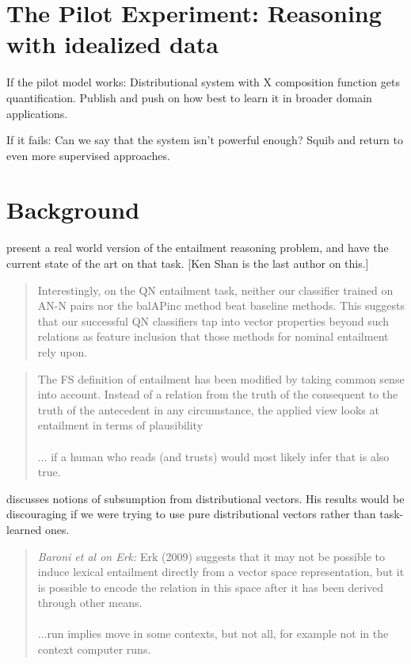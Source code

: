 \documentclass[12pt,leqno,tbtags,twoside]{article}
\theoremstyle{dotless}
\begin{document}
\section{The Pilot Experiment: Reasoning with idealized data}

If the pilot model works: Distributional system with X composition function gets quantification. Publish and push on how best to learn it in broader domain applications.

If it fails: Can we say that the system isn't powerful enough? Squib and return to even more supervised approaches.



\section{Background}

\citet{baroni2012entailment} present a real world version of the entailment reasoning problem, and have the current state of the art on that task. [Ken Shan is the last author on this.]

\begin{quote}
Interestingly, on the QN entailment task, neither our classifier trained on AN-N pairs nor the balAPinc method beat baseline methods. This suggests that our successful QN classifiers tap into vector properties beyond such relations as feature inclusion that those methods for nominal entailment rely upon.
\end{quote}

\begin{quote}
The FS definition of entailment has been modified
by taking common sense into account. Instead of
a relation from the truth of the consequent to the
truth of the antecedent in any circumstance, the
applied view looks at entailment in terms of plausibility \\\\... if a human who reads (and trusts) would most likely infer that is also true.
\end{quote}

\citet{erk2009representing} discusses notions of subsumption from distributional vectors. His results would be discouraging if we were trying to use pure distributional vectors rather than task-learned ones.

\begin{quote}
\textit{Baroni et al on Erk:} Erk (2009) suggests that it
may not be possible to induce lexical entailment
directly from a vector space representation, but it
is possible to encode the relation in this space after it has been derived through other means.\\\\
...run implies move in some contexts, but not all, for example not in the context computer runs.
\end{quote}
\end{document}
